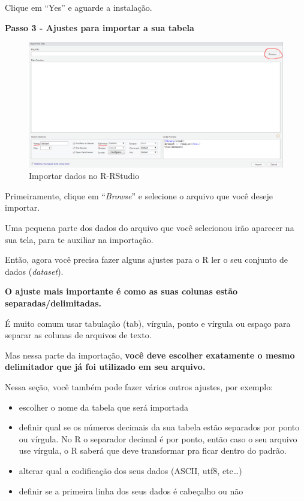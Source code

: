 \documentclass[
]{book}
\begin{document}
Clique em ``Yes'' e aguarde a instalação.

\textbf{Passo 3 - Ajustes para importar a sua tabela}

\begin{figure}
\centering
\includegraphics{imagens/5_importacao3.png}
\caption{Importar dados no R-RStudio}
\end{figure}

Primeiramente, clique em ``\emph{Browse}'' e selecione o arquivo que
você deseje importar.

Uma pequena parte dos dados do arquivo que você selecionou irão aparecer
na sua tela, para te auxiliar na importação.

Então, agora você precisa fazer alguns ajustes para o R ler o seu
conjunto de dados (\emph{dataset}).

\textbf{O ajuste mais importante é como as suas colunas estão
separadas/delimitadas.}

É muito comum usar tabulação (tab), vírgula, ponto e vírgula ou espaço
para separar as colunas de arquivos de texto.

Mas nessa parte da importação, \textbf{você deve escolher exatamente o
mesmo delimitador que já foi utilizado em seu arquivo.}

Nessa seção, você também pode fazer vários outros ajustes, por exemplo:

\begin{itemize}
\item
  escolher o nome da tabela que será importada
\item
  definir qual se os números decimais da sua tabela estão separados por
  ponto ou vírgula. No R o separador decimal é por ponto, então caso o
  seu arquivo use vírgula, o R saberá que deve transformar pra ficar
  dentro do padrão.
\item
  alterar qual a codificação dos seus dados (ASCII, utf8, etc\ldots)
\item
  definir se a primeira linha dos seus dados é cabeçalho ou não
\end{itemize}
\end{document}
